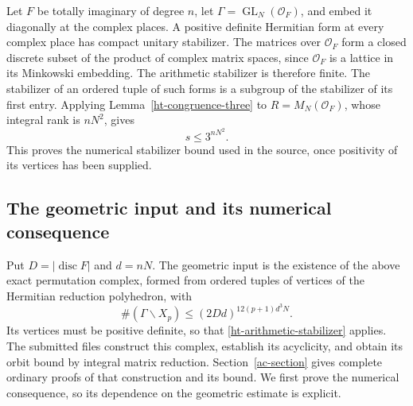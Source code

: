 Let $F$ be totally imaginary of degree $n$, let
$\Gamma=\operatorname{GL}_N(\mathcal O_F)$, and embed it
diagonally at the complex places.  A positive definite
Hermitian form at every complex place has compact unitary
stabilizer.  The matrices over $\mathcal O_F$ form a closed
discrete subset of the product of complex matrix spaces,
since $\mathcal O_F$ is a lattice in its Minkowski embedding.
The arithmetic stabilizer is therefore finite.  The
stabilizer of an ordered tuple of such forms is a subgroup
of the stabilizer of its first entry.  Applying
Lemma~\ref{ht-congruence-three} to
$R=M_N(\mathcal O_F)$, whose integral rank is $nN^2$, gives
\begin{equation}\label{ht-arithmetic-stabilizer}
                         s\le3^{nN^2}.
\end{equation}
This proves the numerical stabilizer bound used in the
source, once positivity of its vertices has been supplied.

\subsection{The geometric input and its numerical consequence}

Put $D=|\operatorname{disc}F|$ and $d=nN$.
The geometric input is the existence of the above exact
permutation complex, formed from ordered tuples of vertices
of the Hermitian reduction polyhedron, with
\begin{equation}\label{ht-geometric-input}
 \#(\Gamma\backslash X_p)
       \le (2Dd)^{12(p+1)d^3N}.
\end{equation}
Its vertices must be positive definite, so that
\eqref{ht-arithmetic-stabilizer} applies.
The submitted files construct this complex, establish its
acyclicity, and obtain its orbit bound by integral matrix
reduction\cite{alpo-uniform-source}. Section~\ref{ac-section}
gives complete ordinary proofs of that construction and its bound.
We first prove the numerical consequence, so its dependence on
the geometric estimate is explicit.

